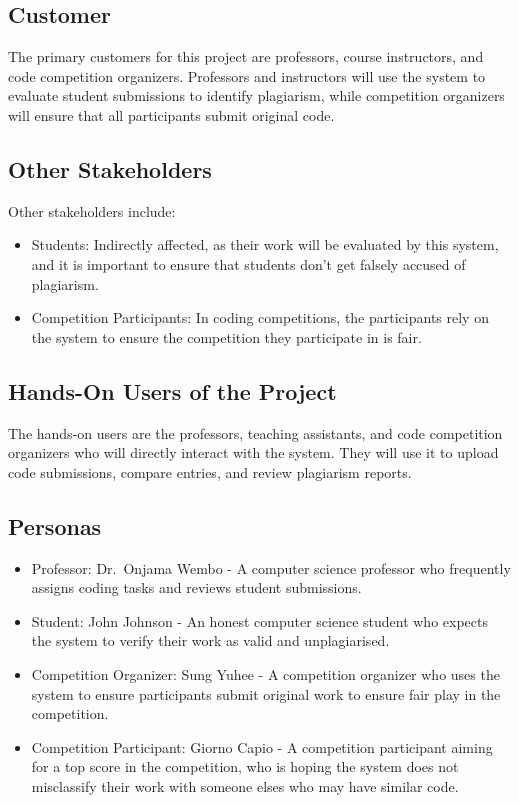 \documentclass[12pt]{article}
\begin{document}
\subsection{Customer}
The primary customers for this project are professors, course instructors, and
code competition organizers. Professors and instructors will use the system to
evaluate student submissions to identify plagiarism, while competition
organizers will ensure that all participants submit original code. 

\subsection{Other Stakeholders}
Other stakeholders include:
\begin{itemize}
    \item Students: Indirectly affected, as their work will be evaluated by this
    system, and it is important to ensure that students don't get falsely accused
    of plagiarism.
    \item Competition Participants: In coding competitions, the participants
    rely on the system to ensure the competition they participate in is fair.
\end{itemize}

\subsection{Hands-On Users of the Project}
The hands-on users are the professors, teaching assistants, and code competition
organizers who will directly interact with the system. They will use it to
upload code submissions, compare entries, and review plagiarism reports.

\subsection{Personas}
\begin{itemize}
    \item Professor: Dr.\ Onjama Wembo - A computer science professor who
    frequently assigns coding tasks and reviews student submissions.
    \item Student: John Johnson - An honest computer science student who
    expects the system to verify their work as valid and unplagiarised.
    \item Competition Organizer: Sung Yuhee - A competition organizer who
    uses the system to ensure participants submit original work to ensure fair
    play in the competition.
    \item Competition Participant: Giorno Capio - A competition participant
    aiming for a top score in the competition, who is hoping the system does not
    misclassify their work with someone elses who may have similar code.
\end{itemize}
\end{document}
